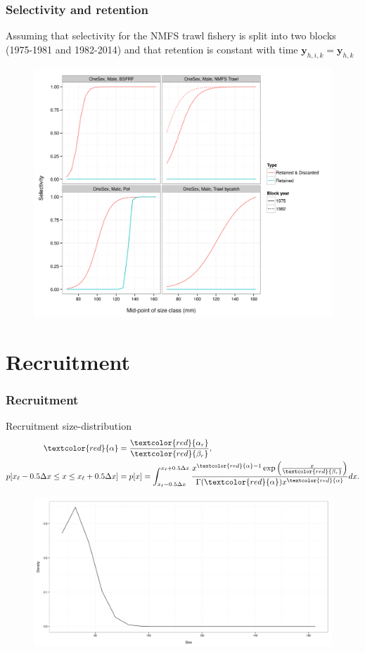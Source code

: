 \documentclass{beamer}
\begin{document}
\begin{frame}
\frametitle{Selectivity and retention}
Assuming that selectivity for the NMFS trawl fishery is split into two blocks
(1975-1981 and 1982-2014) and that retention is constant with time
$\boldsymbol{y}_{h,i,k} = \boldsymbol{y}_{h,k}$
\begin{figure}[!htbp]
  \centering
  \includegraphics[width=0.6\linewidth]{../../examples/bbrkc/OneSex/figure/selectivity.png}
\end{figure}
\end{frame}


\section{Recruitment}


\begin{frame}
\frametitle{Recruitment}
Recruitment size-distribution
\begin{align*}
  \textcolor{red}{\alpha} &= \frac{\textcolor{red}{\alpha_r}}{\textcolor{red}{\beta_r}},\\
  p[x_\ell-0.5 \Delta x \le x \le x_\ell+0.5 \Delta x] &= p[x] = \int^{x_\ell+0.5
    \Delta x}_{x_\ell-0.5 \Delta x} \frac{ x^{\textcolor{red}{\alpha} - 1} \exp
    \left( \frac{x}{\textcolor{red}{\beta_r}} \right)}
    {\Gamma (\textcolor{red}{\alpha}) x^{\textcolor{red}{\alpha}}} dx.
\end{align*}
\begin{figure}[!htbp]
  \centering
  \includegraphics[width=0.75\linewidth]{../../examples/bbrkc/OneSex/figure/rec_size.png}
\end{figure}
\end{frame}
\end{document}
